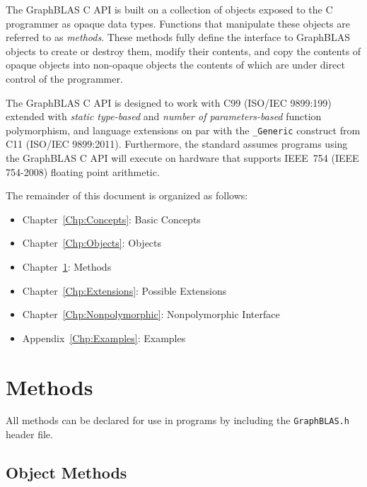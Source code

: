 \documentclass[11pt]{extbook}
\begin{document}
The GraphBLAS C API is built on a collection of objects exposed to 
the C programmer as opaque data types. Functions that manipulate these
objects are referred to as {\it methods}.  These methods fully define the 
interface to GraphBLAS objects to create or destroy them, modify their 
contents, and copy the contents of opaque objects into non-opaque objects the 
contents of which are under direct control of the programmer.

The GraphBLAS C API is designed to work with C99 (ISO/IEC 9899:199) 
extended with {\it static type-based} and {\it number of parameters-based}
function polymorphism, and language extensions on par with 
the {\tt \_Generic} construct from C11 (ISO/IEC 9899:2011).  
Furthermore, the standard assumes programs using the GraphBLAS C API
will execute on hardware that supports IEEE~754 (IEEE 754-2008) 
floating point arithmetic.

The remainder of this document is organized as follows:
\begin{itemize}
\item Chapter~\ref{Chp:Concepts}: Basic Concepts
\item Chapter~\ref{Chp:Objects}: Objects
\item Chapter~\ref{Chp:Methods}: Methods
\item Chapter~\ref{Chp:Extensions}: Possible Extensions
\item Chapter~\ref{Chp:Nonpolymorphic}: Nonpolymorphic Interface
\item Appendix~\ref{Chp:Examples}: Examples
\end{itemize}







\chapter{Methods}
\label{Chp:Methods}
All methods can be declared for use in programs by including the {\tt GraphBLAS.h} header file.



\section{Object Methods}

%


\end{document}
